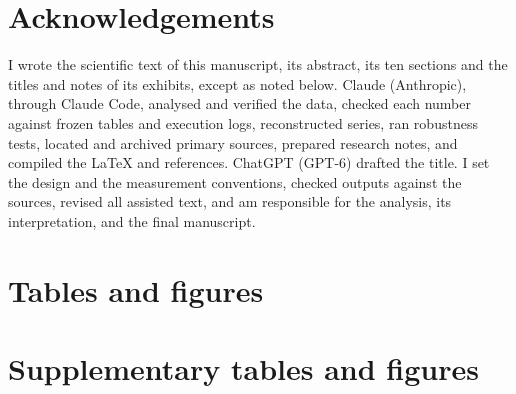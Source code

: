 \documentclass[12pt,a4paper]{article}
\begin{document}
\section*{Acknowledgements}

I wrote the scientific text of this manuscript, its abstract, its ten sections and the titles and notes of its exhibits, except as noted below. Claude (Anthropic), through Claude Code, analysed and verified the data, checked each number against frozen tables and execution logs, reconstructed series, ran robustness tests, located and archived primary sources, prepared research notes, and compiled the LaTeX and references. ChatGPT (GPT-6) drafted the title. I set the design and the measurement conventions, checked outputs against the sources, revised all assisted text, and am responsible for the analysis, its interpretation, and the final manuscript.

\clearpage
\section*{Tables and figures}


\clearpage
\appendix
\renewcommand{\thesection}{\Alph{section}}
\section{Supplementary tables and figures}
\label{sec:appendix-tables}
\setcounter{table}{0}
\setcounter{figure}{0}
\renewcommand{\theHtable}{A\arabic{table}}\renewcommand{\theHfigure}{A\arabic{figure}}


\clearpage
\setcounter{table}{0}\renewcommand{\theHtable}{B\arabic{table}}

\clearpage



\end{document}
